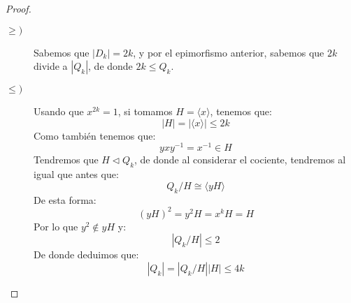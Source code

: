 \begin{ejemplo}
\begin{itemize}
\begin{proof}
                \begin{description}
                    \item [$\geq)$] Sabemos que $|D_k| = 2k$, y por el epimorfismo anterior, sabemos que $2k$ divide a $|Q_k|$, de donde $2k\leq Q_k$.
                    \item [$\leq)$] Usando que $x^{2k} = 1$, si tomamos $H = \langle x \rangle $, tenemos que:
                        \begin{equation*}
                            |H| = |\langle x \rangle | \leq 2k
                        \end{equation*}
                        Como también tenemos que:
                        \begin{equation*}
                            yxy^{-1} = x^{-1}\in H
                        \end{equation*}
                        Tendremos que $H\lhd Q_k$, de donde al considerar el cociente, tendremos al igual que antes que:
                        \begin{equation*}
                            Q_k/H \cong \langle yH \rangle 
                        \end{equation*}
                        De esta forma:
                        \begin{equation*}
                            {(yH)}^{2} = y^2H = x^kH = H
                        \end{equation*}
                        Por lo que $y^2\notin yH$ y:
                        \begin{equation*}
                            |Q_k/H| \leq 2
                        \end{equation*}
                        De donde deduimos que:
                        \begin{equation*}
                            |Q_k| = |Q_k/H||H| \leq 4k
                        \end{equation*}
                \end{description}


\end{proof}
\end{itemize}
\end{ejemplo}
